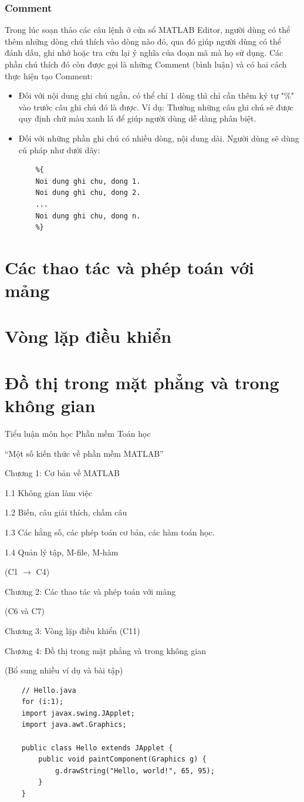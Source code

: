 \documentclass[12pt,a4paper]{article}
\begin{document}
\subsubsection{Comment}
Trong lúc soạn thảo các câu lệnh ở cửa sổ MATLAB Editor, người dùng có thể thêm những dòng chú thích vào dòng nào đó, qua đó giúp người dùng có thể đánh dấu, ghi nhớ hoặc tra cứu lại ý nghĩa của đoạn mã mà họ sử dụng. Các phần chú thích đó còn được gọi là những Comment (bình luận) và có hai cách thực hiện tạo Comment:
\begin{itemize}
	\item Đối với nội dung ghi chú ngắn, có thể chỉ 1 dòng thì chỉ cần thêm ký tự "\%" vào trước câu ghi chú đó là được. Ví dụ: \textcolor{green}{} Thường những câu ghi chú sẽ được quy định chữ màu xanh lá để giúp người dùng dễ dàng phân biệt.
	\item Đối với những phần ghi chú có nhiều dòng, nội dung dài. Người dùng sẽ dùng cú pháp như dưới dây:
\begin{lstlisting}
	%{
	Noi dung ghi chu, dong 1.
	Noi dung ghi chu, dong 2.
	...
	Noi dung ghi chu, dong n.
	%}
\end{lstlisting}
\end{itemize}
\section{Các thao tác và phép toán với mảng}
\section{Vòng lặp điều khiển}
\section{Đồ thị trong mặt phẳng và trong không gian}
	
	
	Tiểu luận môn học Phần mềm Toán học

“Một số kiến thức về phần mềm MATLAB”

Chương 1: Cơ bản về MATLAB

1.1  Không gian làm việc

1.2  Biến, câu giải thích, chấm câu

1.3  Các hằng số, các phép toán cơ bản, các hàm toán học.

1.4  Quản lý tập, M-file, M-hàm

(C1 $\rightarrow$ C4)

Chương 2: Các thao tác và phép toán với mảng

(C6 và C7)

Chương 3: Vòng lặp điều khiển (C11)

Chương 4: Đồ thị trong mặt phẳng và trong không gian

(Bổ sung nhiều ví dụ và bài tập)
	\begin{lstlisting}
	// Hello.java
	for (i:1);
	import javax.swing.JApplet;
	import java.awt.Graphics;

	public class Hello extends JApplet {
    	public void paintComponent(Graphics g) {
        	g.drawString("Hello, world!", 65, 95);
    	}    
	}
	\end{lstlisting}
	
\end{document}

